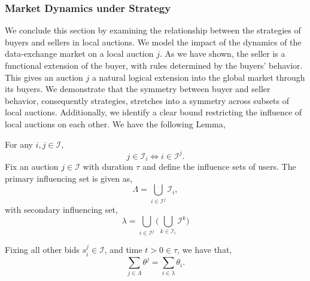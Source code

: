 \documentclass[12pt]{article}
\theoremstyle{definition}
\newcommand{\mcI}{\mathcal{I}}
\begin{document}
\begin{multicols}{2}
\subsubsection{Market Dynamics under Strategy}

We conclude this section by examining the relationship between the strategies of buyers and
sellers in local auctions. We model the impact of the dynamics of the
data-exchange market on a local auction $j$. As we have shown, the seller
is a functional extension of the buyer, with rules determined by the buyers'
behavior. This gives an auction $j$ a natural logical extension into the
global market through its buyers. We demonstrate that the symmetry between
buyer and seller behavior, consequently strategies, stretches into a symmetry across subsets of local
auctions. Additionally, we identify a clear bound restricting the influence of
local auctions on each other. We have the following Lemma,
{
\label{userunion}
For any $i,j\in \mcI$, 
\begin{equation}\label{jtoi}
j\in\mcI_i \Leftrightarrow i\in\mcI^j.
\end{equation}
Fix an auction $j\in\mcI$ with duration $\tau$ and define the influence sets of users. 
The primary influencing set is given as,
\begin{equation}\label{lambda}
    \Lambda = \displaystyle\bigcup_{i\in\mcI^j} \mcI_i,
\end{equation}
with secondary influencing set,
\begin{equation}\label{llambda}
    \lambda = \bigcup_{i\in\mcI^j} \bigg(\bigcup_{k\in\mcI_i} \mcI^k \bigg)
\end{equation}
\iffalse
(THE SELLERS ALL THE BUYERS IN $j$ HAVE IN COMMON! i.e. $j$ AND...)
\begin{equation}%
    \Lambda = \displaystyle\bigcap_{i\in\mcI^j} \mcI_i,
\end{equation}
(THE COLLECTION OF BUYERS FROM EACH $i$ THAT ARE COMMON ACROSS ALL THE $i$'s SELLER
POOLS)
\begin{equation}%
    \lambda = \bigcup_{i\in\mcI^j} \bigg(\bigcap_{k\in\mcI_i} \mcI^k \bigg)
\end{equation}
\fi
Fixing all other bids $s_i^j \in \mcI$, and time $t>0\in\tau$, we have that,
\begin{equation}\label{unioneq}
    \displaystyle\sum_{j\in\Lambda} \theta^j = \sum_{i\in\lambda} \theta_i.

\end{equation}}
\end{multicols}
\end{document}
